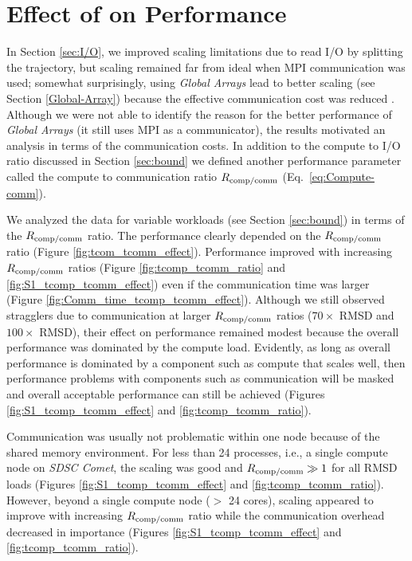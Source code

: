 
\section{Effect of \Rcompcomm on Performance}
\label{sec:tcomm}

In Section \ref{sec:I/O}, we improved scaling limitations due to read I/O by splitting the trajectory, but scaling remained far from ideal when MPI communication was used; somewhat surprisingly, using \emph{Global Arrays} lead to better scaling (see Section \ref{Global-Array}) because the effective communication cost was reduced .
Although we were not able to identify the reason for the better performance of \emph{Global Arrays} (it still uses MPI as a communicator), the results motivated an analysis in terms of the communication costs.
In addition to the compute to I/O ratio \RcompIO discussed in Section \ref{sec:bound} we defined another performance parameter called the compute to communication ratio $R_{\text{comp/comm}}$ (Eq.~\ref{eq:Compute-comm}).

We analyzed the data for variable workloads (see Section \ref{sec:bound}) in terms of the $R_{\text{comp/comm}}$ ratio.
The performance clearly depended on the $R_{\text{comp/comm}}$ ratio (Figure \ref{fig:tcom_tcomm_effect}).
Performance improved with increasing $R_{\text{comp/comm}}$ ratios (Figure \ref{fig:tcomp_tcomm_ratio} and \ref{fig:S1_tcomp_tcomm_effect}) even if the communication time was larger (Figure \ref{fig:Comm_time_tcomp_tcomm_effect}).
Although we still observed stragglers due to communication at larger $R_{\text{comp/comm}}$ ratios ($70\times$ RMSD and $100\times$ RMSD), their effect on performance remained modest because the overall performance was dominated by the compute load. 
Evidently, as long as overall performance is dominated by a component such as compute that scales well, then performance problems with components such as communication will be masked and overall acceptable performance can still be achieved (Figures \ref{fig:S1_tcomp_tcomm_effect} and \ref{fig:tcomp_tcomm_ratio}).

Communication was usually not problematic within one node because of the shared memory environment.
For less than 24 processes, i.e., a single compute node on \emph{SDSC Comet}, the scaling was good and $R_{\text{comp/comm}} \gg 1$ for all RMSD loads (Figures \ref{fig:S1_tcomp_tcomm_effect} and \ref{fig:tcomp_tcomm_ratio}).
However, beyond a single compute node ($>$ 24 cores), scaling appeared to improve with increasing $R_{\text{comp/comm}}$ ratio while the communication overhead decreased in importance (Figures \ref{fig:S1_tcomp_tcomm_effect} and \ref{fig:tcomp_tcomm_ratio}).

